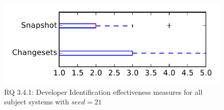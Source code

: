 
\begin{figure}
\centering
\includegraphics[height=0.4\textheight]{figures/dit_seed/rq1_tiny_21}
\caption{RQ 3.4.1: Developer Identification effectiveness measures for all subject systems with $seed=21$}
\label{fig:dit_seed:rq1:tiny}
\end{figure}
